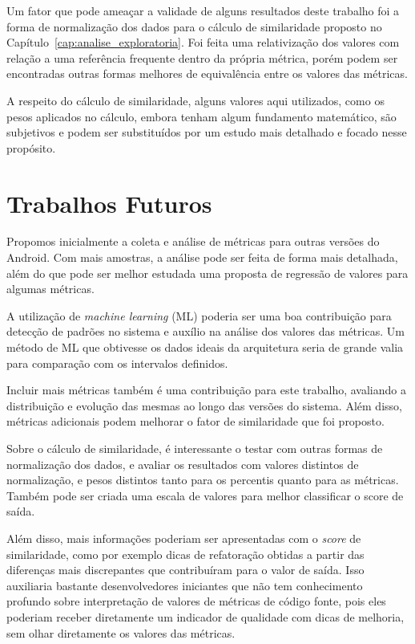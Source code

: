 Um fator que pode ameaçar a validade de alguns resultados deste trabalho foi a forma de normalização dos dados para o cálculo de similaridade proposto no Capítulo~\ref{cap:analise_exploratoria}. Foi feita uma relativização dos valores com relação a uma referência frequente dentro da própria métrica, porém podem ser encontradas outras formas melhores de equivalência entre os valores das métricas.

A respeito do cálculo de similaridade, alguns valores aqui utilizados, como os pesos aplicados no cálculo, embora tenham algum fundamento matemático, são subjetivos e podem ser substituídos por um estudo mais detalhado e focado nesse propósito.

\section{Trabalhos Futuros}

Propomos inicialmente a coleta e análise de métricas para outras versões do Android. Com mais amostras, a análise pode ser feita de forma mais detalhada, além do que pode ser melhor estudada uma proposta de regressão de valores para algumas métricas.

A utilização de \textit{machine learning} (ML) poderia ser uma boa contribuição para detecção de padrões no sistema e auxílio na análise dos valores das métricas. Um método de ML que obtivesse os dados ideais da arquitetura seria de grande valia para comparação com os intervalos definidos.

Incluir mais métricas também é uma contribuição para este trabalho, avaliando a distribuição e evolução das mesmas ao longo das versões do sistema. Além disso, métricas adicionais podem melhorar o fator de similaridade que foi proposto.

Sobre o cálculo de similaridade, é interessante o testar com outras formas de normalização dos dados, e avaliar os resultados com valores distintos de normalização, e pesos distintos tanto para os percentis quanto para as métricas. Também pode ser criada uma escala de valores para melhor classificar o score de saída.

Além disso, mais informações poderiam ser apresentadas com o \textit{score} de similaridade, como por exemplo dicas de refatoração obtidas a partir das diferenças mais discrepantes que contribuíram para o valor de saída. Isso auxiliaria bastante desenvolvedores iniciantes que não tem conhecimento profundo sobre interpretação de valores de métricas de código fonte, pois eles poderiam receber diretamente um indicador de qualidade com dicas de melhoria, sem olhar diretamente os valores das métricas.
